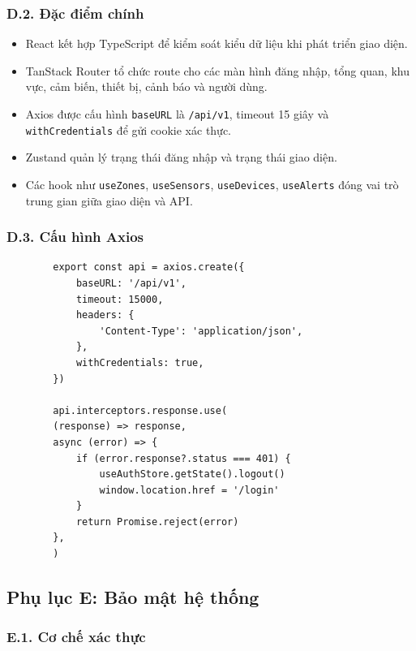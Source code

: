 \documentclass[13pt,a4paper]{extarticle}
\numberwithin{figure}{section}
\numberwithin{table}{section}
\begin{document}
	\subsubsection*{D.2. Đặc điểm chính}
	
	\noindent
	\begin{itemize}
		\item React kết hợp TypeScript để kiểm soát kiểu dữ liệu khi phát triển giao diện.
		\item TanStack Router tổ chức route cho các màn hình đăng nhập, tổng quan, khu vực, cảm biến, thiết bị, cảnh báo và người dùng.
		\item Axios được cấu hình \texttt{baseURL} là \texttt{/api/v1}, timeout 15 giây và \texttt{withCredentials} để gửi cookie xác thực.
		\item Zustand quản lý trạng thái đăng nhập và trạng thái giao diện.
		\item Các hook như \texttt{useZones}, \texttt{useSensors}, \texttt{useDevices}, \texttt{useAlerts} đóng vai trò trung gian giữa giao diện và API.
	\end{itemize}
	
	\subsubsection*{D.3. Cấu hình Axios}
	
	\noindent
	\begin{lstlisting}
		export const api = axios.create({
			baseURL: '/api/v1',
			timeout: 15000,
			headers: {
				'Content-Type': 'application/json',
			},
			withCredentials: true,
		})
		
		api.interceptors.response.use(
		(response) => response,
		async (error) => {
			if (error.response?.status === 401) {
				useAuthStore.getState().logout()
				window.location.href = '/login'
			}
			return Promise.reject(error)
		},
		)
	\end{lstlisting}
	
	\subsection*{Phụ lục E: Bảo mật hệ thống}
	
	\subsubsection*{E.1. Cơ chế xác thực}
	
\end{document}
